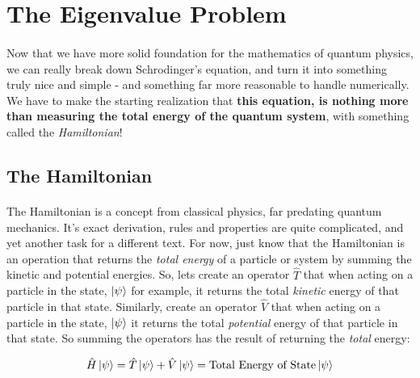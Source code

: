 \documentclass[12pt,letterpaper]{book}
\begin{document}
\section{The Eigenvalue Problem}

\paragraph*{}Now that we have more solid foundation for the mathematics of quantum physics, we can really break down Schrodinger's equation, and turn it into something truly nice and simple - and something far more reasonable to handle numerically. We have to make the starting realization that \textbf{this equation, is nothing more than measuring the total energy of the quantum system}, with something called the \textit{Hamiltonian}!


\subsection*{The Hamiltonian} 

\paragraph*{}The Hamiltonian is a concept from classical physics, far predating quantum mechanics. It's exact derivation, rules and properties are quite complicated, and yet another task for a different text. For now, just know that the Hamiltonian is an operation that returns the \textit{total energy} of a particle or system by summing the kinetic and potential energies. So, lets create an operator $\hat{T}$ that when acting on a particle in the state, $\ket{\psi}$ for example, it returns the total \textit{kinetic} energy of that particle in that state. Similarly, create an operator $\hat{V}$ that when acting on a particle in the state, $\ket{\psi}$ it returns the total \textit{potential} energy of that particle in that state. So summing the operators has the result of returning the \textit{total} energy:

\begin{equation}
\label{Hamiltonian}
\hat{H}\ket{\psi} = \hat{T}\ket{\psi} + \hat{V}\ket{\psi} = \text{Total Energy of State}\ket{\psi}
\end{equation}
\end{document}
